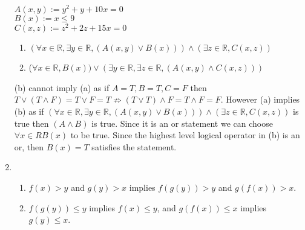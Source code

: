 \documentclass[12pt, letterpaper]{article}
\newcommand{\R}{\mathbb{R}}
\begin{document}
\begin{enumerate}
\begin{enumerate}
	\end{enumerate}
	$A(x,y) := y^2 + y + 10x = 0$\\
	$B(x) := x \leq 9$\\
	$C(x,z) := z^2 + 2z + 15x = 0$\\
	\begin{enumerate}
	\item $(\forall x \in \R, \exists y \in \R, (A(x,y)\vee B(x))) \wedge (\exists z \in \R, C(x,z))$
	\item ($\forall x \in \R, B(x)) \vee (\exists y \in \R,\exists z \in \R,( A(x,y) \wedge  C(x,z)))$
	\end{enumerate}
	(b) cannot imply (a) as if $A = T, B = T, C = F$ then $T \vee (T \wedge F) = T \vee F = T \not \Rightarrow (T \vee T) \wedge F = T \wedge F = F$.  However (a) implies (b) as if $(\forall x \in \R, \exists y \in \R, (A(x,y)\vee B(x))) \wedge (\exists z \in \R, C(x,z))$ is true then $(A \wedge B)$ is true.  Since it is an or statement we can choose $\forall x \in R B(x)$ to be true.  Since the highest level logical operator in (b) is an or, then $B(x) = T$ satisfies the statement.  
	
	\item \begin{enumerate}
		\item $f(x)>y$ and $g(y)>x$ implies $f(g(y))>y$ and $g(f(x))>x$.
		\item $f(g(y)) \leq y$ implies $f(x) \leq y$, and $g(f(x)) \leq x$ implies $g(y) \leq x$. \\
		

\end{enumerate}
\end{enumerate}
\end{document}
